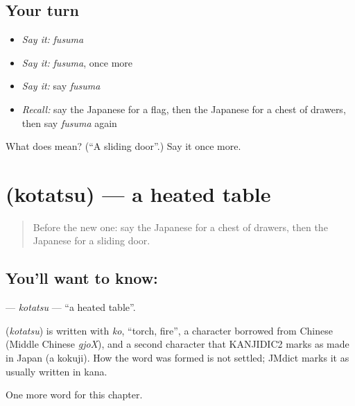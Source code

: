 \subsection*{Your turn}
\begin{itemize}
\raggedright
  \item \emph{Say it:} \emph{fusuma}
  \item \emph{Say it:} \emph{fusuma}, once more
  \item \emph{Say it:} say \emph{fusuma}
  \item \emph{Recall:} say the Japanese for a flag, then the Japanese for a chest of drawers, then say \emph{fusuma} again
\end{itemize}

\begin{tcolorbox}[breakable,colback=teal!4,colframe=teal!35!black,title={Before you move on}]
What does  mean? (\textquotedblleft{}A sliding door\textquotedblright{}.) Say it once more.
\end{tcolorbox}
\section[\texorpdfstring{\ja{こたつ} (kotatsu)}{こたつ (kotatsu)}]{ (kotatsu) — a heated table}

\label{lesson:JA-C101-kotatsu}



\begin{quote}
Before the new one: say the Japanese for a chest of drawers, then the Japanese for a sliding door.
\end{quote}

\subsection*{You'll want to know: }
\textbf{} — \emph{kotatsu} — \textquotedblleft{}a heated table\textquotedblright{}.

\begin{cousinweb}
\textbf{} (\emph{kotatsu}) is written with \emph{ko}, \textquotedblleft{}torch, fire\textquotedblright{}, a character borrowed from Chinese (Middle Chinese \emph{gjoX}), and a second character that KANJIDIC2 marks as made in Japan (a kokuji). How the word was formed is not settled; JMdict marks it as usually written in kana.
\end{cousinweb}

\begin{grammarlens}[title={What you've built}]
One more word for this chapter.
\end{grammarlens}

